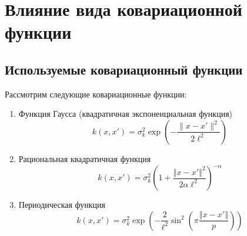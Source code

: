 \documentclass[11pt,a4paper]{article}
\providecommand{\tightlist}{%
      \setlength{\itemsep}{0pt}\setlength{\parskip}{0pt}}
\begin{document}
    \hypertarget{ux432ux43bux438ux44fux43dux438ux435-ux432ux438ux434ux430-ux43aux43eux432ux430ux440ux438ux430ux446ux438ux43eux43dux43dux43eux439-ux444ux443ux43dux43aux446ux438ux438}{%
\section{Влияние вида ковариационной
функции}\label{ux432ux43bux438ux44fux43dux438ux435-ux432ux438ux434ux430-ux43aux43eux432ux430ux440ux438ux430ux446ux438ux43eux43dux43dux43eux439-ux444ux443ux43dux43aux446ux438ux438}}

    \hypertarget{ux438ux441ux43fux43eux43bux44cux437ux443ux435ux43cux44bux435-ux43aux43eux432ux430ux440ux438ux430ux446ux438ux43eux43dux43dux44bux439-ux444ux443ux43dux43aux446ux438ux438}{%
\subsection{Используемые ковариационный
функции}\label{ux438ux441ux43fux43eux43bux44cux437ux443ux435ux43cux44bux435-ux43aux43eux432ux430ux440ux438ux430ux446ux438ux43eux43dux43dux44bux439-ux444ux443ux43dux43aux446ux438ux438}}

Рассмотрим следующие ковариационные функции:

\begin{enumerate}
\def\labelenumi{\arabic{enumi}.}
\tightlist
\item
  Функция Гаусса (квадратичная экспоненциальная функция) \[
    k(x, x') = \sigma_k^2 \exp \left( -\frac{\lVert x - x' \rVert^2}{2\ell^2}  \right)
  \]
\item
  Рациональная квадратичная функция \[
    k(x, x') = \sigma_k^2 \left( 1 + \frac{ \left\Vert x - x' \right\Vert^2}{2 \alpha \ell^2} \right)^{-\alpha}
  \]
\item
  Периодическая функция \[
    k(x, x') = \sigma_k^2 \exp \left(-\frac{2}{\ell^2}\sin^2 \left( \pi \frac{\left\Vert x - x' \right\Vert}{p}\right) \right)
  \]
\end{enumerate}
\end{document}
